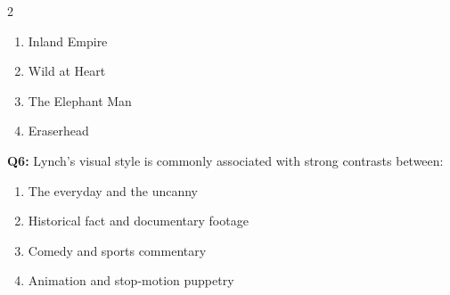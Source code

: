 \documentclass[10pt]{article}
\begin{document}
\begin{multicols}{2}
\begin{enumerate}[label=\arabic*.]
\item Inland Empire
\item Wild at Heart
\item The Elephant Man
\item Eraserhead
\end{enumerate}
\textbf{Q6:} Lynch's visual style is commonly associated with strong contrasts between:

\begin{enumerate}[label=\arabic*.]
\item The everyday and the uncanny
\item Historical fact and documentary footage
\item Comedy and sports commentary
\item Animation and stop-motion puppetry
\end{enumerate}
\end{multicols}

\newpage
\end{document}
